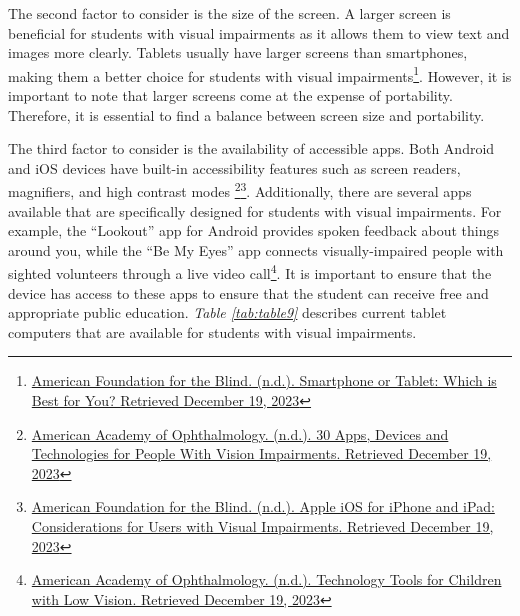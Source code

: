 The second factor to consider is the size of the screen. A larger screen is beneficial for students with visual impairments as it allows them to view text and images more clearly. Tablets usually have larger screens than smartphones, making them a better choice for students with visual impairments\footnote{\raggedright \href{https://www.afb.org/blindness-and-low-vision/using-technology/cell-phones-tablets-mobile/smartphone-or-tablet-which}{American Foundation for the Blind. (n.d.). Smartphone or Tablet: Which is Best for You? Retrieved December 19, 2023}}. However, it is important to note that larger screens come at the expense of portability. Therefore, it is essential to find a balance between screen size and portability.

The third factor to consider is the availability of accessible apps. Both Android and iOS devices have built-in accessibility features such as screen readers, magnifiers, and high contrast modes \footnote{\raggedright \href{https://www.aao.org/eye-health/tips-prevention/low-vision-impairment-apps-tech-assistive-devices }{American Academy of Ophthalmology. (n.d.). 30 Apps, Devices and Technologies for People With Vision Impairments. Retrieved December 19, 2023}}\fnsep\footnote{\raggedright \href{https://www.afb.org/blindness-and-low-vision/using-technology/cell-phones-tablets-mobile/apple-ios-iphone-and-ipad }{American Foundation for the Blind. (n.d.). Apple iOS for iPhone and iPad: Considerations for Users with Visual Impairments. Retrieved December 19, 2023}}. Additionally, there are several apps available that are specifically designed for students with visual impairments. For example, the “Lookout” app for Android provides spoken feedback about things around you, while the “Be My Eyes” app connects visually-impaired people with sighted volunteers through a live video call\footnote{\raggedright \href{https://www.aao.org/eye-health/tips-prevention/technology-apps-devices-children-blind-low-vision}{American Academy of Ophthalmology. (n.d.). Technology Tools for Children with Low Vision. Retrieved December 19, 2023}}. It is important to ensure that the device has access to these apps to ensure that the student can receive free and appropriate public education.
\textit{Table \ref{tab:table9}} describes current tablet computers that are available for students with visual impairments.

